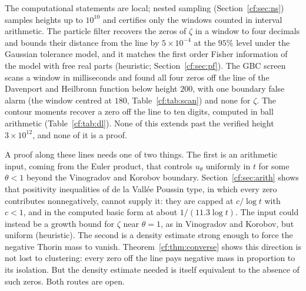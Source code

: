 The computational statements are local; nested sampling (Section~\ref{cf:sec:ns}) samples heights up to $10^{10}$ and certifies only the windows counted in interval arithmetic. The particle filter recovers the zeros of $\zeta$ in a window to four decimals and bounds their distance from the line by $5\times10^{-4}$ at the $95\%$ level under the Gaussian tolerance model, and it matches the first order Fisher information of the model with free real parts (heuristic; Section~\ref{cf:sec:pf}). The GBC screen scans a window in milliseconds and found all four zeros off the line of the Davenport and Heilbronn function below height $200$, with one boundary false alarm (the window centred at $180$, Table~\ref{cf:tab:scan}) and none for $\zeta$. The contour moments recover a zero off the line to ten digits, computed in ball arithmetic (Table~\ref{cf:tab:dl}). None of this extends past the verified height $3\times10^{12}$, and none of it is a proof.

A proof along these lines needs one of two things. The first is an arithmetic input, coming from the Euler product, that controls $u_\theta$ uniformly in $t$ for some $\theta<1$ beyond the Vinogradov and Korobov boundary. Section~\ref{cf:sec:arith} shows that positivity inequalities of de la Vall\'ee Poussin type, in which every zero contributes nonnegatively, cannot supply it: they are capped at $c/\log t$ with $c<1$, and in the computed basic form at about $1/(11.3\log t)$. The input could instead be a growth bound for $\zeta$ near $\theta=1$, as in Vinogradov and Korobov, but uniform (heuristic). The second is a density estimate strong enough to force the negative Thorin mass to vanish. Theorem~\ref{cf:thm:converse} shows this direction is not lost to clustering: every zero off the line pays negative mass in proportion to its isolation. But the density estimate needed is itself equivalent to the absence of such zeros. Both routes are open.
